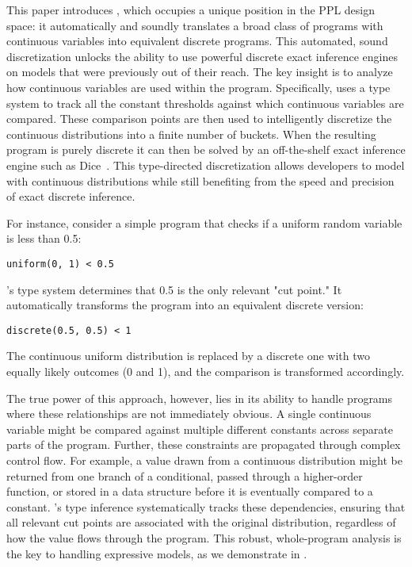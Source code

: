 This paper introduces \Slice{}, which occupies a unique position in the PPL design space: it automatically and soundly translates a broad class of programs with continuous variables into equivalent discrete programs. This automated, sound discretization unlocks the ability to use powerful discrete exact inference engines on models that were previously out of their reach. The key insight is to analyze how continuous variables are used within the program. Specifically, \Slice{} uses a type system to track all the constant thresholds against which continuous variables are compared. These comparison points are then used to intelligently discretize the continuous distributions into a finite number of buckets. When the resulting program is purely discrete it can then be solved by an off-the-shelf exact inference engine such as Dice~\cite{Holtzen2020Dice}. This type-directed discretization allows developers to model with continuous distributions while still benefiting from the speed and precision of exact discrete inference.

For instance, consider a simple program that checks if a uniform random variable is less than 0.5:
\begin{lstlisting}[aboveskip=1em,belowskip=1em]
    uniform(0, 1) < 0.5
\end{lstlisting}
\noindent \Slice{}'s type system determines that 0.5 is the only relevant "cut point." It automatically transforms the program into an equivalent discrete version:
\begin{lstlisting}[aboveskip=1em,belowskip=1em]
    discrete(0.5, 0.5) < 1
\end{lstlisting}
\noindent The continuous uniform distribution is replaced by a discrete one with two equally likely outcomes (0 and 1), and the comparison is transformed accordingly.

The true power of this approach, however, lies in its ability to handle programs where these relationships are not immediately obvious. A single continuous variable might be compared against multiple different constants across separate parts of the program. Further, these constraints are propagated through complex control flow. For example, a value drawn from a continuous distribution might be returned from one branch of a conditional, passed through a higher-order function, or stored in a data structure before it is eventually compared to a constant. \Slice{}'s type inference systematically tracks these dependencies, ensuring that all relevant cut points are associated with the original distribution, regardless of how the value flows through the program. This robust, whole-program analysis is the key to handling expressive models, as we demonstrate in .

